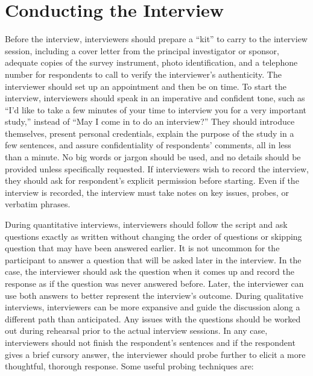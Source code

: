 \section{Conducting the Interview}

Before the interview, interviewers should prepare a ``kit'' to carry to the interview session, including a cover letter from the principal investigator or sponsor, adequate copies of the survey instrument, photo identification, and a telephone number for respondents to call to verify the interviewer's authenticity. The interviewer should set up an appointment and then be on time. To start the interview, interviewers should speak in an imperative and confident tone, such as ``I'd like to take a few minutes of your time to interview you for a very important study,'' instead of ``May I come in to do an interview?'' They should introduce themselves, present personal credentials, explain the purpose of the study in a few sentences, and assure confidentiality of respondents' comments, all in less than a minute. No big words or jargon should be used, and no details should be provided unless specifically requested. If interviewers wish to record the interview, they should ask for respondent's explicit permission before starting. Even if the interview is recorded, the interview must take notes on key issues, probes, or verbatim phrases.

During quantitative interviews, interviewers should follow the script and ask questions exactly as written without changing the order of questions or skipping question that may have been answered earlier. It is not uncommon for the participant to answer a question that will be asked later in the interview. In the case, the interviewer should ask the question when it comes up and record the response as if the question was never answered before. Later, the interviewer can use both answers to better represent the interview's outcome. During qualitative interviews, interviewers can be more expansive and guide the discussion along a different path than anticipated. Any issues with the questions should be worked out during rehearsal prior to the actual interview sessions. In any case, interviewers should not finish the respondent's sentences and if the respondent gives a brief cursory answer, the interviewer should probe further to elicit a more thoughtful, thorough response. Some useful probing techniques are:


